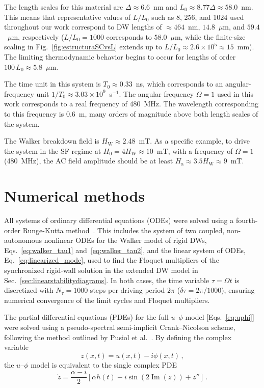 \documentclass[prb,aps,twocolumn,superscriptaddress,floatfix]{revtex4-2}
\begin{document}
The length scales for this material are $\Delta\approx6.6$~nm and $L_0\approx8.77\Delta\approx58.0$~nm. This means that representative values of $L/L_0$ such as 8, 256, and 1024 used throughout our work correspond to DW lengths of $\approx 464$~nm, $14.8$~$\mu$m, and $59.4$~$\mu$m, respectively ($L/L_0 = 1000$ corresponds to $58.0$~$\mu$m, while the finite-size scaling in Fig.~\ref{fig:estructuraSCvsL} extends up to $L/L_0 \approx 2.6\times 10^5 \approx 15$~mm). The limiting thermodynamic behavior begins to occur for lengths of order $100\, L_0\approx5.8$~$\mu$m.

The time unit in this system is $T_0 \approx0.33$~ns, which corresponds to an angular-frequency unit $1/T_0\approx3.03\times10^{9}$~s$^{-1}$. The angular frequency $\Omega=1$ used in this work corresponds to a real frequency of 480~MHz. The wavelength corresponding to this frequency is $0.6$~m, many orders of magnitude above both length scales of the system. 

The Walker breakdown field is $H_\text{W}\approx2.48$~mT. As a specific example, to drive the system in the SF regime at $H_0=4H_\text{W}\approx10$~mT, with a frequency of $\Omega=1$ (480~MHz), the AC field amplitude should be at least $H_\text{a}\approx3.5H_\text{W}\approx9$~mT.

\section{Numerical methods}
\label{ap:num_met}

All systems of ordinary differential equations (ODEs) were solved using a fourth-order Runge-Kutta method~\cite{press2007numerical}. This includes the system of two coupled, non-autonomous nonlinear ODEs for the Walker model of rigid DWs, Eqs.~\eqref{eq:walker_tau1} and~\eqref{eq:walker_tau2}, and the linear system of ODEs, Eq.~\eqref{eq:linearized_mode}, used to find the Floquet multipliers of the synchronized rigid-wall solution in the extended DW model in Sec.~\ref{sec:linearstabilitydiagrams}. In both cases, the time variable $\tau = \Omega t$ is discretized with $N_\tau = 1000$ steps per driving period $2\pi$ ($\delta\tau = 2\pi/1000$), ensuring numerical convergence of the limit cycles and Floquet multipliers.

The partial differential equations (PDEs) for the full $u$--$\phi$ model [Eqs.~\eqref{eq:uphi}] were solved using a pseudo-spectral semi-implicit Crank--Nicolson scheme, following the method outlined by Pusiol et al.~\cite{pusiol2026deterministic}. By defining the complex variable~\cite{skaugen2022}
\begin{equation}
    z(x,t)=u(x,t)-i\phi(x,t)\, ,
    \label{eq:z_def}
\end{equation}
the $u$--$\phi$ model is equivalent to the single complex PDE
\begin{equation}
    \dot z = \frac{\alpha-i}{2}\left[\alpha h(t) - i \sin\left(2\operatorname{Im}(z)\right)+z''\right]\, .
    \label{eq:z_eq}
\end{equation}
\end{document}
